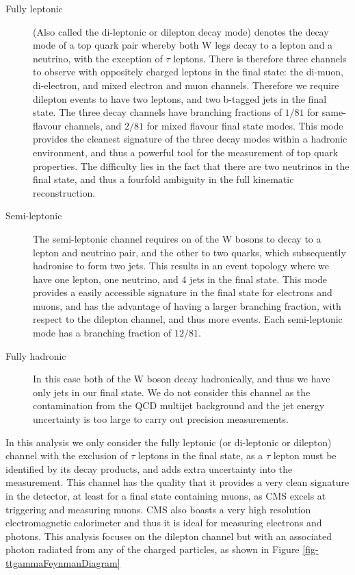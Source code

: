 \begin{description}
	\item[Fully leptonic] (Also called the di-leptonic or dilepton decay mode) denotes the decay mode of a top quark pair whereby both W legs decay to a lepton and a neutrino, with the exception of $\tau$ leptons. There is therefore three channels to observe with oppositely charged leptons in the final state: the di-muon, di-electron, and mixed electron and muon channels. Therefore we require dilepton events to have two leptons, and two b-tagged jets in the final state. The three decay channels have branching fractions of $1/81$ for same-flavour channels, and $2/81$ for mixed flavour final state modes. This mode provides the cleanest signature of the three decay modes within a hadronic environment, and thus a powerful tool for the measurement of top quark properties. The difficulty lies in the fact that there are two neutrinos in the final state, and thus a fourfold ambiguity in the full kinematic reconstruction.
	\item[Semi-leptonic] The semi-leptonic channel requires on of the W bosons to decay to a lepton and neutrino pair, and the other to two quarks, which subsequently hadronise to form two jets. This results in an event topology where we have one lepton, one neutrino, and 4 jets in the final state. This mode provides a easily accessible signature in the final state for electrons and muons, and has the advantage of having a larger branching fraction, with respect to the dilepton channel, and thus more events. Each semi-leptonic mode has a branching fraction of $12/81$.
	\item[Fully hadronic] In this case both of the W boson decay hadronically, and thus we have only jets in our final state. We do not consider this channel as the contamination from the QCD multijet background and the jet energy uncertainty is too large to carry out precision measurements. 
\end{description}

In this analysis we only consider the fully leptonic (or di-leptonic or dilepton) channel with the exclusion of $\tau$ leptons in the final state, as a $\tau$ lepton must be identified by its decay products, and adds extra uncertainty into the measurement. This channel has the quality that it provides a very clean signature in the detector, at least for a final state containing muons, as CMS excels at triggering and measuring muons. CMS also boasts a very high resolution electromagnetic calorimeter and thus it is ideal for measuring electrons and photons. This analysis focuses on the dilepton channel but with an associated photon radiated from any of the charged particles, as shown in Figure \ref{fig-ttgammaFeynmanDiagram}

